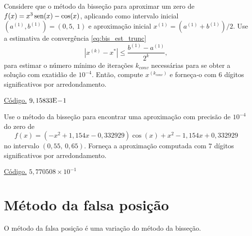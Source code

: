 \begin{exer}\label{exer:bis_est_trunc}
  Considere que o método da bisseção para aproximar um zero de $f(x)=x^3\operatorname{sen}(x)-\cos(x)$, aplicando como intervalo inicial $(a^{(1)}, b^{(1)}) = (0,5, ~1)$ e aproximação inicial $x^{(1)}=(a^{(1)}+b^{(1)})/2$. Use a estimativa de convergência \eqref{eq:bis_est_trunc}
  \begin{equation}
    \left|x^{(k)} - x^{*}\right| \leq \frac{b^{(1)}-a^{(1)}}{2^k},
  \end{equation}
para estimar o número mínimo de iterações $k_{conv}$ necessárias para se obter a solução com exatidão de $10^{-4}$. Então, compute $x^{(k_{conv})}$ e forneça-o com $6$ dígitos significativos por arredondamento.
\end{exer}
\begin{resp}
    \ifisoctave 
  \href{https://github.com/phkonzen/notas/blob/master/src/MatematicaNumerica/cap_aritm/dados/exer_bis_este_trunc/exer_bis_est_trunc.m}{Código.} 
  \fi
  $9,15833\mathrm{E}\!-\!1$
\end{resp}

\begin{exer}\label{exer:bis_multpar}
  Use o método da bisseção para encontrar uma aproximação com precisão de $10^{-4}$ do zero de
  \begin{equation}
    f(x) = (-x^2+1,154x-0,332929)\cos(x) + x^2 - 1,154x + 0,332929
  \end{equation}
no intervalo $(0,55, ~0,65)$. Forneça a aproximação computada com $7$ dígitos significativos por arredondamento.
\end{exer}
\begin{resp}
    \ifisoctave 
  \href{https://github.com/phkonzen/notas/blob/master/src/MatematicaNumerica/cap_aritm/dados/exer_bis_multpar/exer_bis_multpar.m}{Código.} 
  \fi
  $5,770508\times 10^{-1}$
\end{resp}

\section{Método da falsa posição}\label{cap_eq1d_sec_falsapos}

O método da falsa posição é uma variação do método da bisseção.


